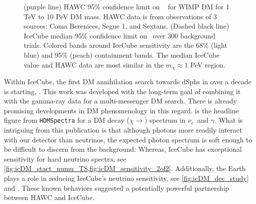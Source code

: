 \begin{figure}[t]
    \caption{(purple line) HAWC 95\% confidence limit on \sv~ for WIMP DM for 1 TeV to 10 PeV DM mass. HAWC data is from observations of 3 sources: Coma Berenices, Segue 1, and Sextans. (Dashed black line) IceCube median 95\% confidence limit on \sv~over 300 background trials. Colored bands around IceCube sensitivity are the 68\% (light blue) and 95\% (peach) containment bands. The median IceCube value and HAWC data are most similar in the $m_\chi \approx 1$ PeV region.}
    \label{fig:nuDuck_sens}
\end{figure}

Within IceCube, the first DM annihilation search towards dSphs in over a decade is starting, .
This work was developed with the long-term goal of combining it with the gamma-ray data for a multi-messenger DM search.
There is already promising developments in DM phenomenology in this regard.
 is the headline figure from \texttt{HDMSpectra} \cite{Rodd:HDM_spec} for a DM decay ($\chi \rightarrow$) spectrum in $\nu_e$~and $\gamma$.
What is intriguing from this publication is that although photons more readily interact with our detector than neutrinos, the expected photon spectrum is soft enough to be difficult to discern from the background.
Whereas, IceCube has exceptional sensitivity for hard neutrino spectra, see \cref{fig:icDM_stact_numu_TS,fig:icDM_sensitivity_2of2}.
Additionally, the Earth plays a role in reducing IceCube's neutrino sensitivity, see \cref{fig:icDM_dec_study} and \cite{IC3:Earth_Attenuation}.
These known behaviors suggested a potentially powerful partnership between HAWC and IceCube.


